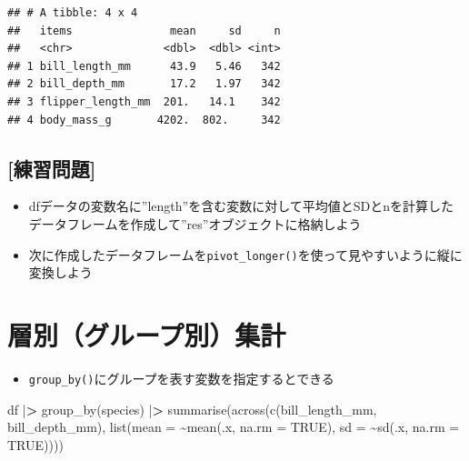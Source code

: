 \documentclass[
  xelatex,ja=standard, b5paper]{bxjsbook}
\newenvironment{Shaded}{\begin{snugshade}}{\end{snugshade}}
\newcommand{\AttributeTok}[1]{\textcolor[rgb]{0.77,0.63,0.00}{#1}}
\newcommand{\ConstantTok}[1]{\textcolor[rgb]{0.00,0.00,0.00}{#1}}
\newcommand{\ErrorTok}[1]{\textcolor[rgb]{0.64,0.00,0.00}{\textbf{#1}}}
\newcommand{\FunctionTok}[1]{\textcolor[rgb]{0.00,0.00,0.00}{#1}}
\newcommand{\NormalTok}[1]{#1}
\newcommand{\SpecialCharTok}[1]{\textcolor[rgb]{0.00,0.00,0.00}{#1}}
\providecommand{\tightlist}{%
  \setlength{\itemsep}{0pt}\setlength{\parskip}{0pt}}
\begin{document}
\begin{verbatim}
## # A tibble: 4 x 4
##   items               mean     sd     n
##   <chr>              <dbl>  <dbl> <int>
## 1 bill_length_mm      43.9   5.46   342
## 2 bill_depth_mm       17.2   1.97   342
## 3 flipper_length_mm  201.   14.1    342
## 4 body_mass_g       4202.  802.     342
\end{verbatim}

\hypertarget{ux7df4ux7fd2ux554fux984c-15}{%
\subsection{{[}練習問題{]}}\label{ux7df4ux7fd2ux554fux984c-15}}

\begin{itemize}
\tightlist
\item
  dfデータの変数名に''length''を含む変数に対して平均値とSDとnを計算したデータフレームを作成して''res''オブジェクトに格納しよう
\item
  次に作成したデータフレームを\texttt{pivot\_longer()}を使って見やすいように縦に変換しよう
\end{itemize}

\hypertarget{su-group}{%
\section{層別（グループ別）集計}\label{su-group}}

\begin{itemize}
\tightlist
\item
  \texttt{group\_by()}にグループを表す変数を指定するとできる
\end{itemize}

\begin{Shaded}
\begin{Highlighting}[]
\NormalTok{df }\SpecialCharTok{|}\ErrorTok{\textgreater{}} 
  \FunctionTok{group\_by}\NormalTok{(species) }\SpecialCharTok{|}\ErrorTok{\textgreater{}} 
  \FunctionTok{summarise}\NormalTok{(}\FunctionTok{across}\NormalTok{(}\FunctionTok{c}\NormalTok{(bill\_length\_mm, bill\_depth\_mm),}
                   \FunctionTok{list}\NormalTok{(}\AttributeTok{mean =} \SpecialCharTok{\textasciitilde{}}\FunctionTok{mean}\NormalTok{(.x, }\AttributeTok{na.rm =} \ConstantTok{TRUE}\NormalTok{),}
                        \AttributeTok{sd =} \SpecialCharTok{\textasciitilde{}}\FunctionTok{sd}\NormalTok{(.x, }\AttributeTok{na.rm =} \ConstantTok{TRUE}\NormalTok{))))}
\end{Highlighting}
\end{Shaded}
\end{document}
